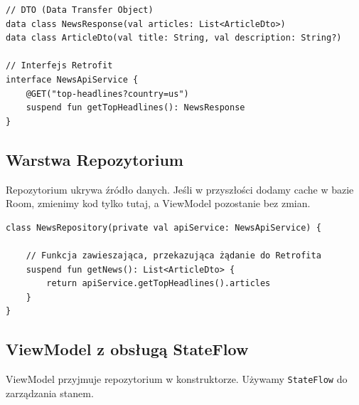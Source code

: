 \begin{verbatim}
// DTO (Data Transfer Object)
data class NewsResponse(val articles: List<ArticleDto>)
data class ArticleDto(val title: String, val description: String?)

// Interfejs Retrofit
interface NewsApiService {
    @GET("top-headlines?country=us")
    suspend fun getTopHeadlines(): NewsResponse
}
\end{verbatim}

\subsection{Warstwa Repozytorium}

Repozytorium ukrywa źródło danych. Jeśli w przyszłości dodamy cache w bazie Room, zmienimy kod tylko tutaj, a ViewModel pozostanie bez zmian.

\begin{verbatim}
class NewsRepository(private val apiService: NewsApiService) {
    
    // Funkcja zawieszająca, przekazująca żądanie do Retrofita
    suspend fun getNews(): List<ArticleDto> {
        return apiService.getTopHeadlines().articles
    }
}
\end{verbatim}

\subsection{ViewModel z obsługą StateFlow}

ViewModel przyjmuje repozytorium w konstruktorze. Używamy \texttt{StateFlow} do zarządzania stanem.

